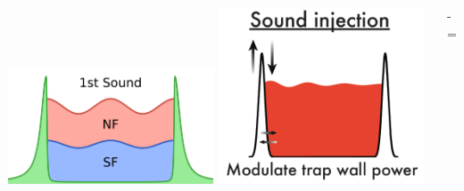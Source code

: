 \documentclass[26pt, paperwidth=36in,paperheight=48in]{tikzposter} %
\begin{document}
\begin{columns}
{\begin{minipage}{0.2\textwidth}
		\includegraphics[width=0.49\textwidth]{figures/first_sound_cartoon.pdf}
		\includegraphics[width=0.49\textwidth,
		trim=0.6cm 1.0cm 0.6cm 0cm,clip]{figures/first_sound_injection.png}
	\end{minipage}
	\hspace{0.1cm}
	\begin{minipage}{0.3\textwidth}
		\centering
		\huge{-}
		\huge{=}
		\\
		

\end{minipage}}
\end{columns}
\end{document}
